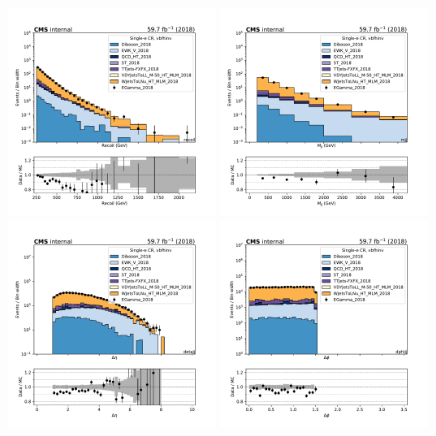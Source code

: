\begin{figure}[htbp]
    \begin{center}
        \includegraphics[width=0.49\textwidth]{fig/datamc/cr_1e_vbf/cr_1e_vbf_recoil_losf_2018.pdf}
        \includegraphics[width=0.49\textwidth]{fig/datamc/cr_1e_vbf/cr_1e_vbf_mjj_losf_2018.pdf} \\
        \includegraphics[width=0.49\textwidth]{fig/datamc/cr_1e_vbf/cr_1e_vbf_detajj_losf_2018.pdf}
        \includegraphics[width=0.49\textwidth]{fig/datamc/cr_1e_vbf/cr_1e_vbf_dphijj_losf_2018.pdf}

\end{center}
\end{figure}
